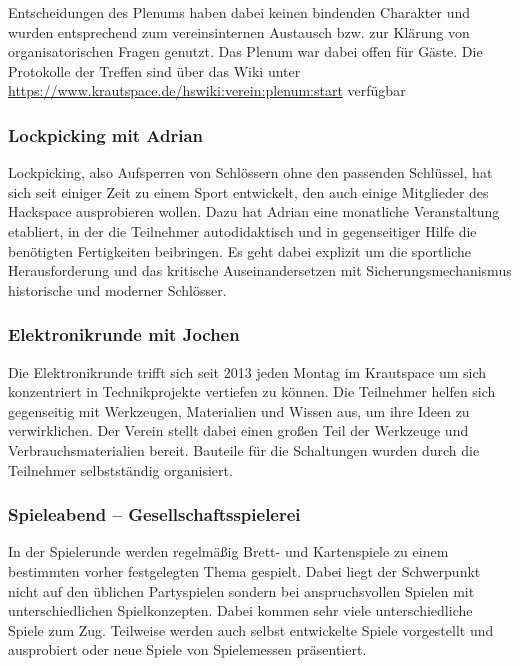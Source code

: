 \documentclass[10pt,DIV16]{scrartcl}
\begin{document}
Entscheidungen des Plenums haben dabei keinen bindenden Charakter und 
wurden entsprechend zum vereinsinternen Austausch bzw. zur Klärung von 
organisatorischen Fragen genutzt. Das Plenum war dabei offen für Gäste. 
Die Protokolle der Treffen sind über das Wiki unter 
\url{https://www.krautspace.de/hswiki:verein:plenum:start} verfügbar


\subsubsection{Lockpicking mit Adrian}

Lockpicking, also Aufsperren von Schlössern ohne den passenden 
Schlüssel, hat sich seit einiger Zeit zu einem Sport entwickelt, den 
auch einige Mitglieder des Hackspace ausprobieren wollen. Dazu hat 
Adrian eine monatliche Veranstaltung etabliert, in der die Teilnehmer 
autodidaktisch und in gegenseitiger Hilfe die benötigten Fertigkeiten 
beibringen. Es geht dabei explizit um die sportliche Herausforderung 
und das kritische Auseinandersetzen mit Sicherungsmechanismus 
historische und moderner Schlösser. 

\subsubsection{Elektronikrunde mit Jochen}

Die Elektronikrunde trifft sich seit 2013 jeden Montag im Krautspace um 
sich konzentriert in Technikprojekte vertiefen zu können. Die 
Teilnehmer helfen sich gegenseitig mit Werkzeugen, Materialien und 
Wissen aus, um ihre Ideen zu verwirklichen. Der Verein stellt dabei 
einen großen Teil der Werkzeuge und Verbrauchsmaterialien bereit. 
Bauteile für die Schaltungen wurden durch die Teilnehmer selbstständig 
organisiert.

\subsubsection{Spieleabend -- Gesellschaftsspielerei}

In der Spielerunde werden regelmäßig Brett- und Kartenspiele zu einem 
bestimmten vorher festgelegten Thema gespielt. Dabei liegt der Schwerpunkt 
nicht auf den üblichen Partyspielen sondern bei anspruchsvollen Spielen mit 
unterschiedlichen Spielkonzepten. Dabei kommen sehr viele unterschiedliche 
Spiele zum Zug. Teilweise werden auch selbst entwickelte Spiele vorgestellt 
und ausprobiert oder neue Spiele von Spielemessen präsentiert. 
\end{document}
